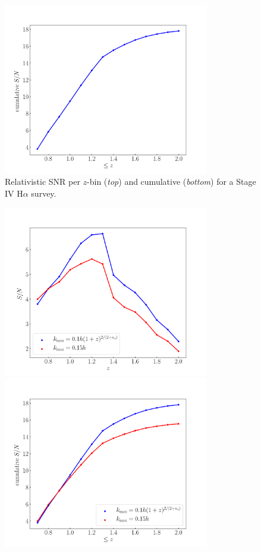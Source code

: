 \begin{itemize}
\begin{figure}[!ht]
\includegraphics[width=0.8\textwidth]{fig/CumulativesnrDoppler-eps-converted-to}
\caption{Relativistic SNR per $z$-bin  ({\em top}) and cumulative ({\em bottom}) for a Stage IV H$\alpha$ survey.} \label{fig4}
\end{figure}
\begin{figure}[!ht]
\centering
\includegraphics[width=0.8\textwidth]{fig/kmaxsnr-eps-converted-to}
\includegraphics[width=0.8\textwidth]{fig/kmaxcumsnr-eps-converted-to} 

\end{figure}
\end{itemize}
